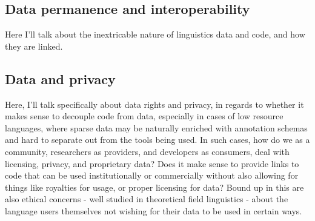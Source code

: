 

\subsection{Data permanence and interoperability}
\label{subsec:data-permanence-and-interoperability}


Here I'll talk about the inextricable nature of linguistics data and code, and how they are linked.

\subsection{Data and privacy}
\label{subsec:data-and-privacy}

Here, I'll talk specifically about data rights and privacy, in regards to whether it makes sense to decouple code from data, especially in cases of low resource languages, where sparse data may be naturally enriched with annotation schemas and hard to separate out from the tools being used. In such cases, how do we as a community, researchers as providers, and developers as consumers, deal with licensing, privacy, and proprietary data? Does it make sense to provide links to code that can be used institutionally or commercially without also allowing for things like royalties for usage, or proper licensing for data? Bound up in this are also ethical concerns - well studied in theoretical field linguistics - about the language users themselves not wishing for their data to be used in certain ways.



